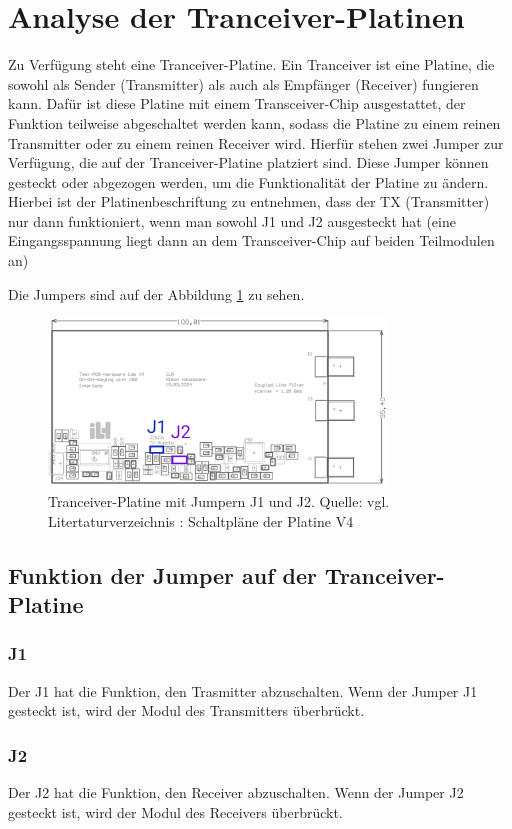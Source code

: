 \section{Analyse der Tranceiver-Platinen}
Zu Verfügung steht eine Tranceiver-Platine. Ein Tranceiver ist eine Platine, die sowohl als Sender (Transmitter) als auch als Empfänger (Receiver) fungieren kann. Dafür ist diese Platine mit einem Transceiver-Chip ausgestattet, der Funktion teilweise abgeschaltet werden kann, sodass die Platine zu einem reinen Transmitter oder zu einem reinen Receiver wird.  
Hierfür stehen zwei Jumper zur Verfügung, die auf der Tranceiver-Platine platziert sind. Diese Jumper können gesteckt oder abgezogen werden, um die Funktionalität der Platine zu ändern. Hierbei ist der Platinenbeschriftung zu entnehmen, dass der TX (Transmitter) nur dann funktioniert, wenn man sowohl J1 und J2 ausgesteckt hat (eine Eingangsspannung liegt dann an dem Transceiver-Chip auf beiden Teilmodulen an)

Die Jumpers sind auf der Abbildung \ref{fig:Tranceiver-Platine} zu sehen.
\begin{figure}[H]
    \centering
    \includegraphics[width=0.8\textwidth]{Pictures/Jumper.jpg}
    \caption{Tranceiver-Platine mit Jumpern J1 und J2. Quelle: vgl. Litertaturverzeichnis \cite{SchaltplanPCBV4}: Schaltpläne der Platine V4}
    \label{fig:Tranceiver-Platine}
\end{figure}
\subsection{Funktion der Jumper auf der Tranceiver-Platine}
\subsubsection{J1}
Der J1 hat die Funktion, den Trasmitter abzuschalten. Wenn der Jumper J1 gesteckt ist, wird der Modul des Transmitters überbrückt.
\subsubsection{J2}
Der J2 hat die Funktion, den Receiver abzuschalten. Wenn der Jumper J2 gesteckt ist, wird der Modul des Receivers überbrückt.


